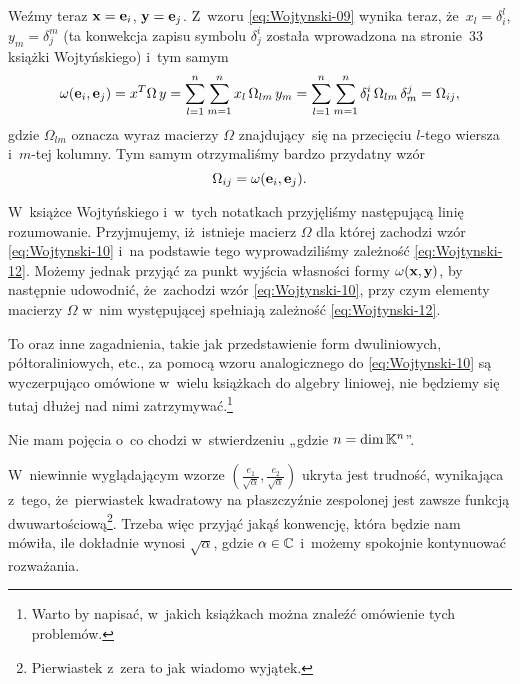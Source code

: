 \documentclass[a4paper,11pt]{article}
\begin{document}
Weźmy teraz $\mathbf{x} = \mathbf{e}_{ i }$, $\mathbf{y} = \mathbf{e}_{ j }$.
Z~wzoru \eqref{eq:Wojtynski-09} wynika teraz, że~$x_{ l } = \delta^{ l }_{ i }$,
$y_{ m } = \delta^{ m }_{ j }$ (ta konwekcja zapisu symbolu $\delta^{ i }_{ j }$ została
wprowadzona na stronie~33 książki Wojtyńskiego) i~tym samym
\begin{equation}
  \label{eq:Wojtynski-11}
  \omega( \mathbf{e}_{ i }, \mathbf{e}_{ j } ) = x^{ T } \Omega \, y =
  \sum_{ l = 1 }^{ n } \sum_{ m = 1 }^{ n } x_{ l } \, \Omega_{ l m } \, y_{ m } =
  \sum_{ l = 1 }^{ n } \sum_{ m = 1 }^{ n } \delta^{ i }_{ l } \, \Omega_{ l m } \, \delta^{ j }_{ m } =
  \Omega_{ i j },
\end{equation}
gdzie $\Omega_{ l m }$ oznacza wyraz macierzy $\Omega$ znajdujący~się na przecięciu
$l$-tego wiersza i~$m$-tej kolumny. Tym samym otrzymaliśmy bardzo przydatny
wzór
\begin{equation}
  \label{eq:Wojtynski-12}
  \Omega_{ i j } = \omega( \mathbf{e}_{ i }, \mathbf{e}_{ j } ).
\end{equation}

W~książce Wojtyńskiego i~w~tych notatkach przyjęliśmy następującą linię
rozumowanie. Przyjmujemy, iż~istnieje macierz $\Omega$ dla której zachodzi wzór
\eqref{eq:Wojtynski-10} i~na podstawie tego wyprowadziliśmy zależność
\eqref{eq:Wojtynski-12}. Możemy jednak przyjąć za punkt wyjścia własności
formy $\omega( \mathbf{x}, \mathbf{y} )$, by następnie udowodnić, że~zachodzi wzór
\eqref{eq:Wojtynski-10}, przy czym elementy macierzy $\Omega$ w~nim występującej
spełniają zależność \eqref{eq:Wojtynski-12}.

To oraz inne zagadnienia, takie jak przedstawienie form dwuliniowych,
półtoraliniowych, etc., za pomocą wzoru analogicznego do
\eqref{eq:Wojtynski-10} są wyczerpująco omówione w~wielu książkach do
algebry liniowej, nie będziemy się tutaj dłużej nad nimi
zatrzymywać.\footnote{Warto by napisać, w~jakich książkach można znaleźć
  omówienie tych problemów.}

\vspace{\spaceFour}




 Nie mam pojęcia o~co chodzi w~stwierdzeniu
„gdzie $n = \dim \mathbb{K}^{ n }$”.

\vspace{\spaceFour}





 W~niewinnie wyglądającym wzorze $\left(
  \frac{ e_{ 1 } }{ \sqrt{ \alpha } }, \frac{ e_{ 2 } }{ \sqrt{ \alpha } } \right)$
ukryta jest trudność, wynikająca z~tego, że~pierwiastek kwadratowy na
płaszczyźnie zespolonej jest zawsze funkcją
dwuwartościową\footnote{Pierwiastek z~zera to jak wiadomo wyjątek.}.
Trzeba więc przyjąć jakąś konwencję, która będzie nam mówiła, ile dokładnie
wynosi $\sqrt{ \alpha }$, gdzie $\alpha \in \mathbb{C}$ i~możemy spokojnie kontynuować
rozważania.
\end{document}
